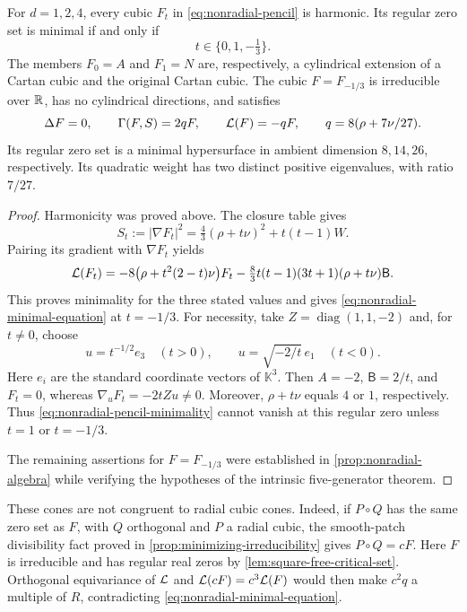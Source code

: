 \begin{theorem}
\label{thm:nonradial-models}
For \(d=1,2,4\), every cubic \(F_t\) in
\eqref{eq:nonradial-pencil} is harmonic. Its regular zero set is
minimal if and only if
\[
 t\in\{0,1,-\tfrac13\}.
\]
The members \(F_0=A\) and \(F_1=N\) are, respectively, a cylindrical
extension of a Cartan cubic and the original Cartan cubic.
The cubic \(F=F_{-1/3}\) is irreducible over \(\mathbb R\), has no
cylindrical directions, and satisfies
\begin{equation}\label{eq:nonradial-minimal-equation}
 \Delta F=0,\qquad
 \Gamma(F,S)=2qF,\qquad
 \mathcal L(F)=-qF,\qquad q=8(\rho+7\nu/27).
\end{equation}
Its regular zero set is a minimal hypersurface in ambient dimension
\(8,14,26\), respectively. Its quadratic weight has two distinct
positive eigenvalues, with ratio \(7/27\).
\end{theorem}

\begin{proof}
Harmonicity was proved above. The closure table gives
\begin{equation}\label{eq:nonradial-pencil-gradient}
 S_t:=|\nabla F_t|^2
   =\tfrac43(\rho+t\nu)^2+t(t-1)W.
\end{equation}
Pairing its gradient with \(\nabla F_t\) yields
\begin{equation}\label{eq:nonradial-pencil-minimality}
 \mathcal L(F_t)=-8\bigl(\rho+t^2(2-t)\nu\bigr)F_t
 -\tfrac83t(t-1)(3t+1)(\rho+t\nu)\mathsf B.
\end{equation}
This proves minimality for the three stated values and gives
\eqref{eq:nonradial-minimal-equation} at \(t=-1/3\).
For necessity, take \(Z=\operatorname{diag}(1,1,-2)\) and, for
\(t\ne0\), choose
\[
 u=t^{-1/2}e_3\quad(t>0),\qquad
 u=\sqrt{-2/t}\,e_1\quad(t<0).
\]
Here \(e_i\) are the standard coordinate vectors of \(\mathbb K^3\).
Then \(A=-2\), \(\mathsf B=2/t\), and \(F_t=0\), whereas
\(\nabla_uF_t=-2tZu\ne0\). Moreover, \(\rho+t\nu\) equals
\(4\) or \(1\), respectively. Thus
\eqref{eq:nonradial-pencil-minimality} cannot vanish at this regular
zero unless \(t=1\) or \(t=-1/3\).

The remaining assertions for \(F=F_{-1/3}\) were established in
\cref{prop:nonradial-algebra} while verifying the hypotheses of the
intrinsic five-generator theorem.
\end{proof}

These cones are not congruent to radial cubic cones. Indeed, if
\(P\circ Q\) has the same zero set as \(F\), with \(Q\) orthogonal
and \(P\) a radial cubic, the smooth-patch divisibility fact proved
in \cref{prop:minimizing-irreducibility} gives \(P\circ Q=cF\).
Here \(F\) is irreducible and has regular real zeros by
\cref{lem:square-free-critical-set}. Orthogonal equivariance of
\(\mathcal L\) and \(\mathcal L(cF)=c^3\mathcal L(F)\) would then make \(c^2q\)
a multiple of \(R\), contradicting
\eqref{eq:nonradial-minimal-equation}.

